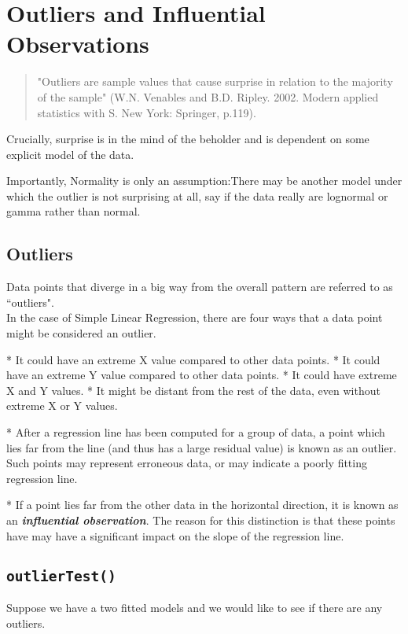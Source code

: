 

\section{Outliers and Influential Observations}
\begin{quote}
"Outliers are sample values that cause surprise in relation to the majority of the sample" (W.N. Venables and B.D. Ripley. 2002. Modern applied statistics with S. New York: Springer, p.119).
\end{quote}

Crucially, surprise is in the mind of the beholder and is dependent on some explicit model of the data. 

Importantly, Normality is only an assumption:There may be another model under which the outlier is not surprising at all, say if the data really are lognormal or 
gamma rather than normal. 

\subsection{Outliers}

Data points that diverge in a big way from the overall pattern are referred to as ``outliers".\\ 
In the case of Simple Linear Regression, there are four ways that a data point might be considered an outlier.


*  It could have an extreme X value compared to other data points.
*  It could have an extreme Y value compared to other data points.
*  It could have extreme X and Y values.
*  It might be distant from the rest of the data, even without extreme X or Y values.



*  After a regression line has been computed for a group of data, a point which lies far from the line 
(and thus has a large residual value) is known as an outlier. 
Such points may represent erroneous data, or may indicate a poorly fitting regression line. 

*  If a point lies far from the other data in the horizontal direction, it is known as an \textit{\textbf{influential observation}}. 
The reason for this distinction is that these points have may have a significant impact on the slope of the regression line.


\subsection*{\texttt{outlierTest()}}
Suppose we have a two fitted models and we would like to see if there are any outliers. 

